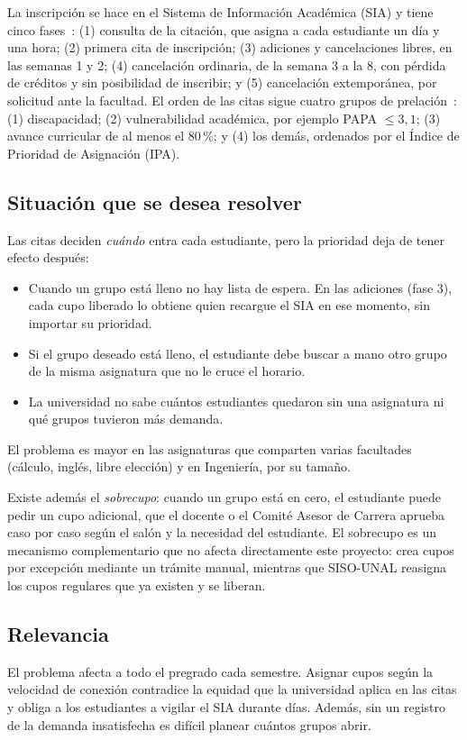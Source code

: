 \documentclass[conference]{IEEEtran}
\begin{document}
La inscripción se hace en el Sistema de Información Académica (SIA) y tiene cinco fases~\cite{dninfoa}: (1) consulta de la citación, que asigna a cada estudiante un día y una hora; (2) primera cita de inscripción; (3) adiciones y cancelaciones libres, en las semanas 1 y 2; (4) cancelación ordinaria, de la semana 3 a la 8, con pérdida de créditos y sin posibilidad de inscribir; y (5) cancelación extemporánea, por solicitud ante la facultad. El orden de las citas sigue cuatro grupos de prelación~\cite{circular13}: (1) discapacidad; (2) vulnerabilidad académica, por ejemplo PAPA $\leq 3{,}1$; (3) avance curricular de al menos el 80\,\%; y (4) los demás, ordenados por el Índice de Prioridad de Asignación (IPA).

\subsection{Situación que se desea resolver}
Las citas deciden \emph{cuándo} entra cada estudiante, pero la prioridad deja de tener efecto después:
\begin{itemize}
    \item Cuando un grupo está lleno no hay lista de espera. En las adiciones (fase 3), cada cupo liberado lo obtiene quien recargue el SIA en ese momento, sin importar su prioridad.
    \item Si el grupo deseado está lleno, el estudiante debe buscar a mano otro grupo de la misma asignatura que no le cruce el horario.
    \item La universidad no sabe cuántos estudiantes quedaron sin una asignatura ni qué grupos tuvieron más demanda.
\end{itemize}
El problema es mayor en las asignaturas que comparten varias facultades (cálculo, inglés, libre elección) y en Ingeniería, por su tamaño.

Existe además el \emph{sobrecupo}: cuando un grupo está en cero, el estudiante puede pedir un cupo adicional, que el docente o el Comité Asesor de Carrera aprueba caso por caso según el salón y la necesidad del estudiante. El sobrecupo es un mecanismo complementario que no afecta directamente este proyecto: crea cupos por excepción mediante un trámite manual, mientras que SISO-UNAL reasigna los cupos regulares que ya existen y se liberan.

\subsection{Relevancia}
El problema afecta a todo el pregrado cada semestre. Asignar cupos según la velocidad de conexión contradice la equidad que la universidad aplica en las citas y obliga a los estudiantes a vigilar el SIA durante días. Además, sin un registro de la demanda insatisfecha es difícil planear cuántos grupos abrir.
\end{document}
